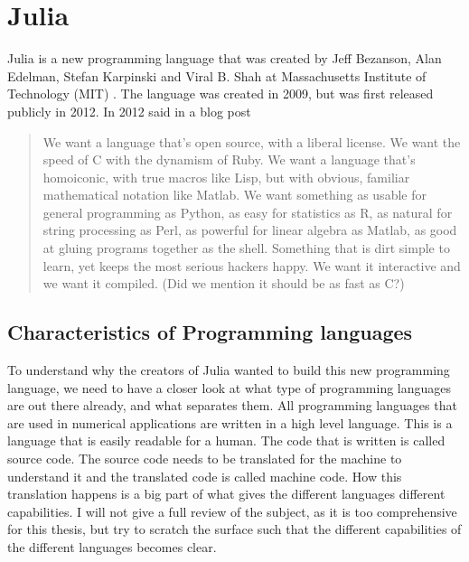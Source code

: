 \chapter{Julia}
\label{ch:Julia}
Julia is a new programming language that was created by Jeff Bezanson, Alan Edelman, Stefan Karpinski and Viral B. Shah at Massachusetts Institute of Technology (MIT) \citep{juliaLab}. The language was created in 2009, but was first released publicly in 2012. In 2012 \cite{juliaBlogRelease2012} said in a blog post
\blockquote{We want a language that’s open source, with a liberal license. We want the speed of C with the dynamism of Ruby. We want a language that’s homoiconic, with true macros like Lisp, but with obvious, familiar mathematical notation like Matlab. We want something as usable for general programming as Python, as easy for statistics as R, as natural for string processing as Perl, as powerful for linear algebra as Matlab, as good at gluing programs together as the shell. Something that is dirt simple to learn, yet keeps the most serious hackers happy. We want it interactive and we want it compiled. (Did we mention it should be as fast as C?)}

\section{Characteristics of Programming languages}
To understand why the creators of Julia wanted to build this new programming language, we need to have a closer look at what type of programming languages are out there already, and what separates them. All programming languages that are used in numerical applications are written in a high level language. This is a language that is easily readable for a human. The code that is written is called source code. The source code needs to be translated for the machine to understand it and the translated code is called machine code. How this translation happens is a big part of what gives the different languages different capabilities. I will not give a full review of the subject, as it is too comprehensive for this thesis, but try to scratch the surface such that the different capabilities of the different languages becomes clear.

